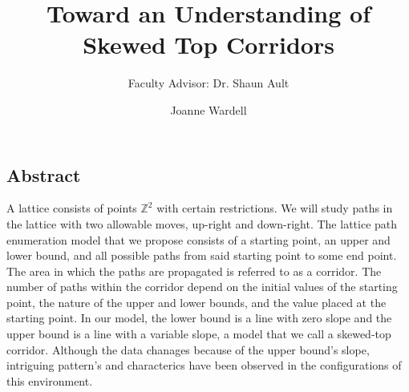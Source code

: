 \documentclass{article}
\title{Toward an Understanding of Skewed Top Corridors}
\author{Faculty Advisor: Dr. Shaun Ault}
\author{Joanne Wardell}
\newcommand*{\set}[1]{\mathbb{#1}}
\newcommand\tab[1][1cm]{\hspace*{#1}}
\begin{document}
\maketitle
\subsection*{Abstract}



\tab A lattice consists of points $\set{Z}^{2}$ with certain restrictions. We will study paths in the lattice with two allowable moves, up-right and down-right. The lattice path enumeration model that we propose 
consists of a starting point, an upper and lower bound, and all possible paths from said starting point to some end point. The area in which the paths are propagated is referred to as a corridor. The number of paths 
within the corridor depend on the initial values of the starting point, the nature of the upper and lower bounds, and the value placed at the starting point. In our model, the lower bound is a line with zero slope 
and the upper bound is a line with a variable slope, a model that we call a skewed-top corridor. Although the data chanages because of the upper bound's slope, intriguing pattern's and characterics have been observed 
in the configurations of this environment.
\end{document}
